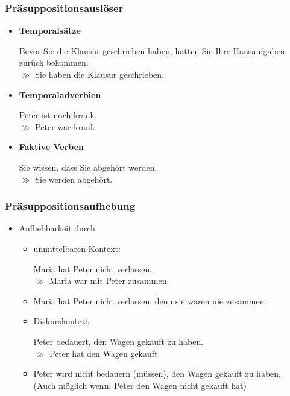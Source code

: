 
\begin{frame}
\frametitle{Präsuppositionsauslöser}

\begin{itemize}
	\item \textbf{Temporalsätze}
	
	\ea Bevor Sie die Klausur geschrieben haben, hatten Sie Ihre Hausaufgaben zurück bekommen.\\
		$\gg$ Sie haben die Klausur geschrieben.
	\z

	\item \textbf{Temporaladverbien}
	
	\ea Peter ist noch krank.\\
		$\gg$ Peter war krank.
	\z
	
	\item \textbf{Faktive Verben}
	
		\ea Sie wissen, dass Sie abgehört werden.\\
		$\gg$ Sie werden abgehört.
		\z
	
\end{itemize}

\end{frame}



\begin{frame}
\frametitle{Präsuppositionsaufhebung}

\begin{itemize}
	\item Aufhebbarkeit durch
	
\vspace{5mm}

	\begin{itemize}
		\item unmittelbaren Kontext:
		
		\ea Maria hat Peter nicht verlassen.\\
			$\gg$ Maria war mit Peter zusammen.
		\z
		
		\item Maria hat Peter nicht verlassen, denn sie waren nie zusammen.
		
\vspace{5mm}

		\item Diskurskontext:
		
		\ea Peter bedauert, den Wagen gekauft zu haben.\\ 
			$\gg$ Peter hat den Wagen gekauft.
		\z
			
		\item Peter wird nicht bedauern (müssen), den Wagen gekauft zu haben. \\(Auch möglich wenn: Peter den Wagen nicht gekauft hat)
				
	\end{itemize}
					
\end{itemize}


\end{frame}


